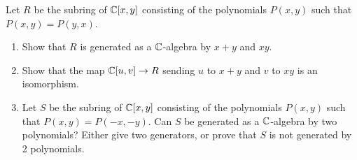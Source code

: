 %
\begin{question}[subtitle=August 2016 Problem 4,ID=Aug16_4]
Let $R$ be the subring of $\mathbb{C}[x, y]$ consisting of the polynomials
$P(x, y)$ such that $P(x, y) = P(y, x)$.
\begin{enumerate}
    \item Show that $R$ is generated as a $\mathbb{C}$-algebra by $x + y$ and $xy$.
    \item  Show that the map $\mathbb{C}[u, v] \to R$ sending $u$ to $x + y$ and $v$ to $xy$ is an isomorphism.
    \item  Let $S$ be the subring of $\mathbb{C}[x, y]$ consisting of the polynomials $P(x, y)$ such that $P(x, y) = P(-x, -y)$. Can $S$ be generated as a $\mathbb{C}$-algebra by two polynomials? Either give two generators, or prove that $S$ is not generated by 2 polynomials.
\end{enumerate}
\end{question}
